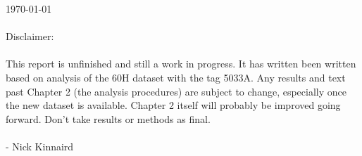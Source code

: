 \clearpage

\today \\ \\
Disclaimer: \\ \\ 

This report is unfinished and still a work in progress. It has written been written based on analysis of the 60H dataset with the tag 5033A. Any results and text past Chapter 2 (the analysis procedures) are subject to change, especially once the new dataset is available. Chapter 2 itself will probably be improved going forward. Don't take results or methods as final. \\ \\


- Nick Kinnaird


\clearpage
